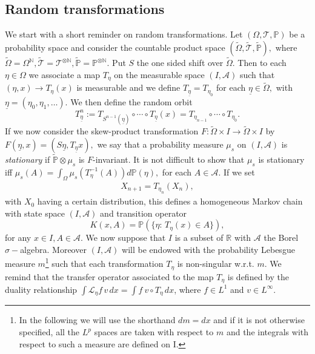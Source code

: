 \documentclass{article}
\newcommand{\etam}{\underline{\eta}}
\newcommand{\1}{\mathbbm{1}}
\begin{document}
\subsection{Random transformations} 
 We start with a short reminder on random transformations. Let $(\Omega, \mathcal{T}, \mathbb{P})$ be a probability space and consider the countable product space $(\tilde{\Omega}, \tilde{\mathcal{T}}, \tilde{\mathbb{P}}),$  where $\tilde{\Omega}=\Omega^{\mathbb{N}}, \tilde{\mathcal{T}}=\mathcal{T}^{\otimes \mathbb{N}}, \tilde{\mathbb{P}}=\mathbb{P}^{\otimes \mathbb{N}}.$ Put $S$ the one sided shift over $\tilde{\Omega}.$ Then to  each $\eta\in \Omega$ we associate a map $T_{\eta}$ on the measurable space $(I, \mathcal{A})$ such that $(\eta, x)\rightarrow T_{\eta}(x)$ is measurable and we define $T_{\etam}=T_{\eta_0}$ for each $\etam\in \tilde{\Omega},$ with $\etam=(\eta_0, \eta_1, \dots).$ We then define the random orbit $$T^n_{\etam}:=T_{S^{n-1}(\etam)}\circ \cdots \circ T_{\etam}(x)=T_{\eta_{n-1}}\circ\cdots\circ T_{\eta_0}.$$
If we now consider the skew-product transformation $F:\tilde{\Omega}\times I\rightarrow \tilde{\Omega}\times I$ by $F(\etam, x)=(S\etam, T_{\etam}x),$ we say that a probability measure $\mu_s$ on $(I, \mathcal{A})$ is {\em stationary} if $\tilde{\mathbb{P}}\otimes\mu_s$ is $F$-invariant. It is not difficult to show that $\mu_s$ is stationary iff $\mu_s(A)=\int_{\Omega}\mu_s(T^{-1}_{\eta}(A))d\mathbb{P}(\eta),$ for each $A\in \mathcal{A}.$ If we set
\begin{eqnarray}\label{mmmkkk}
X_{n+1}=T_{\eta_n}(X_n),
\end{eqnarray}
with $X_0$ having a certain distribution, 
this defines a homogeneous Markov chain with state space $(I, \mathcal{A})$ and transition operator
\begin{equation}\label{TO}
K(x,A)=\mathbb{P}(\{\eta: \,T_{\eta}(x)\in A\}),
\end{equation}
for any $x\in I, A\in \mathcal{A}.$ We now suppose that $I$ is a subset of $\mathbb{R}$ with $\mathcal{A}$ the Borel $\sigma-$algebra. Moreover $(I, \mathcal{A})$ will be  endowed with the probability Lebesgue measure $m$\footnote{In the following we will use the shorthand $dm=dx$ and  if it is not otherwise specified, all the $L^p$ spaces are taken with respect
to $m$ and the integrals with respect to such a measure are defined on I.} such that each transformation $T_{\eta}$ is non-singular w.r.t. $m.$
We remind that the transfer operator associated to the map $T_{\eta}$ is defined by the duality relationship $\int\mathcal{L}_{\eta}f\,v\,dx=\int f \ v\circ T_{\eta}\,dx$, where $f \in L^{1}$ and $v \in L^{\infty}$. 
\end{document}
